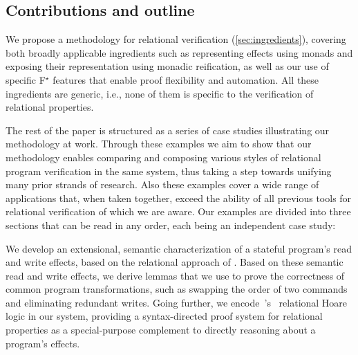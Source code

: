 \documentclass[sigplan,screen]{acmart}\settopmatter{}
\newcommand\citepos[1]{\citeauthor{#1}'s\ \citeyear{#1}}
\newcommand\fstar{F$^\star$\xspace}
\newcommand{\comm}[3]{\ifcheckpagebudget\else\ifdraft{\maybecolor{#1}[#2: #3]}\fi\fi}
\newcommand{\ch}[1]{\comm{teal}{CH}{#1}}
\newcommand*{\IE}{i.e.,\xspace}
\begin{document}
\subsection{Contributions and outline}



We propose a methodology for relational verification (\autoref{sec:ingredients}),
covering both broadly applicable ingredients such as representing
effects using monads and exposing their representation using monadic
reification, as well as our use of specific \fstar{} features that enable
proof flexibility and automation. All these ingredients are generic, \IE
none of them is specific to the verification of relational properties.

The rest of the paper is structured as a series of case studies
illustrating our methodology at work. Through these examples we aim to show
that our methodology enables comparing and composing various styles of
relational program verification in the same system, thus taking a step
towards unifying many prior strands of research.
%
Also these examples cover a wide range of applications that, when
taken together, exceed the ability of all previous tools for
relational verification of which we are aware.
%
Our examples are divided into three sections that can be read in any
order, each being an independent case study:

We \linebreak develop an extensional, semantic characterization of a stateful program's
read and write effects, based on the relational approach
of \citet{benton06aplas}. Based on these semantic read and write effects, we derive
lemmas that we use to prove the correctness of common program
transformations, such as swapping the order of two commands and eliminating
redundant writes. Going further, we encode~\citepos{benton04relational}
relational Hoare logic in our system, providing a syntax-directed proof system
for relational properties as a special-purpose complement
to directly reasoning about a program's effects.
 
\end{document}
